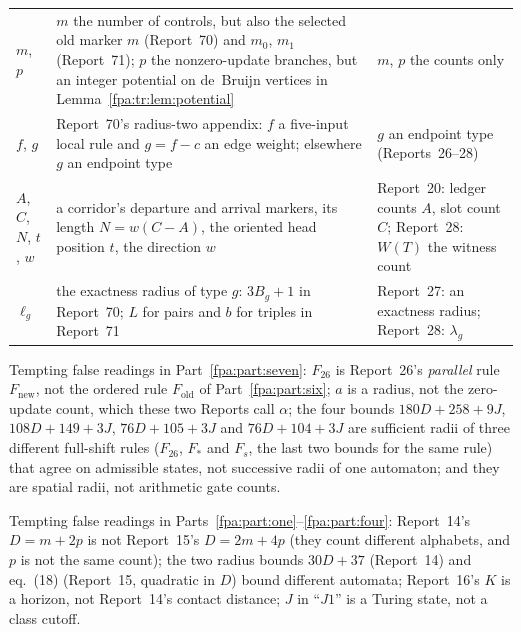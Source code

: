 \documentclass[11pt,a4paper]{article}
\numberwithin{equation}{section}
\begin{document}
\begin{center}
\begin{longtable}{@{}>{\raggedright\arraybackslash}p{}p{}p{}@{}}
$m$, $p$ & $m$ the number of controls, but also the selected old marker $m$ (Report~70) and $m_0$, $m_1$ (Report~71); $p$ the nonzero-update branches, but an integer potential on de~Bruijn vertices in Lemma~\ref{fpa:tr:lem:potential} & $m$, $p$ the counts only\\
$f$, $g$ & Report~70's radius-two appendix: $f$ a five-input local rule and $g=f-c$ an edge weight; elsewhere $g$ an endpoint type & $g$ an endpoint type (Reports~26--28)\\
$A$, $C$, $N$, $t$, $w$ & a corridor's departure and arrival markers, its length $N=w(C-A)$, the oriented head position $t$, the direction $w$ & Report~20: ledger counts $A$, slot count $C$; Report~28: $W(T)$ the witness count\\
$\ell_g$ & the exactness radius of type $g$: $3B_g+1$ in Report~70; $L$ for pairs and $b$ for triples in Report~71 & Report~27: an exactness radius; Report~28: $\lambda_g$\\
\bottomrule
\end{longtable}
\end{center}
Tempting false readings in Part~\ref{fpa:part:seven}: $F_{26}$ is Report~26's \emph{parallel} rule $F_{\mathrm{new}}$, not the ordered rule $F_{\mathrm{old}}$ of Part~\ref{fpa:part:six}; $a$ is a radius, not the zero-update count, which these two Reports call $\alpha$; the four bounds $180D+258+9J$, $108D+149+3J$, $76D+105+3J$ and $76D+104+3J$ are sufficient radii of three different full-shift rules ($F_{26}$, $F_*$ and $F_s$, the last two bounds for the same rule) that agree on admissible states, not successive radii of one automaton; and they are spatial radii, not arithmetic gate counts.

Tempting false readings in Parts~\ref{fpa:part:one}--\ref{fpa:part:four}: Report~14's $D=m+2p$ is not Report~15's $D=2m+4p$ (they count different alphabets, and $p$ is not the same count); the two radius bounds $30D+37$ (Report~14) and eq.~(18) (Report~15, quadratic in $D$) bound different automata; Report~16's $K$ is a horizon, not Report~14's contact distance; $J$ in ``$J1$'' is a Turing state, not a class cutoff.
\end{document}
